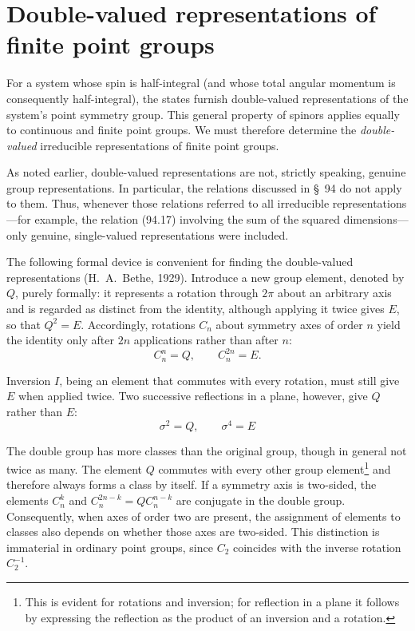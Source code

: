 \section{Double-valued representations of finite point groups}

For a system whose spin is half-integral (and whose total angular momentum is consequently half-integral), the states furnish double-valued representations of the system's point symmetry group. This general property of spinors applies equally to continuous and finite point groups. We must therefore determine the \emph{double-valued} irreducible representations of finite point groups.

As noted earlier, double-valued representations are not, strictly speaking, genuine group representations. In particular, the relations discussed in \S~94 do not apply to them. Thus, whenever those relations referred to all irreducible representations---for example, the relation (94.17) involving the sum of the squared dimensions---only genuine, single-valued representations were included.

The following formal device is convenient for finding the double-valued representations (H.~A.~Bethe, 1929). Introduce a new group element, denoted by $Q$, purely formally: it represents a rotation through $2\pi$ about an arbitrary axis and is regarded as distinct from the identity, although applying it twice gives $E$, so that $Q^2=E$. Accordingly, rotations $C_n$ about symmetry axes of order $n$ yield the identity only after $2n$ applications rather than after $n$:
\begin{equation}
 C_n^n=Q,\qquad C_n^{2n}=E. \tag{99.1}
\end{equation}

Inversion $I$, being an element that commutes with every rotation, must still give $E$ when applied twice. Two successive reflections in a plane, however, give $Q$ rather than $E$:
\begin{equation}
 \sigma^2=Q,\qquad \sigma^4=E \tag{99.2}
\end{equation}




The double group has more classes than the original group, though in general not twice as many. The element $Q$ commutes with every other group element\footnote{This is evident for rotations and inversion; for reflection in a plane it follows by expressing the reflection as the product of an inversion and a rotation.} and therefore always forms a class by itself. If a symmetry axis is two-sided, the elements $C_n^k$ and $C_n^{2n-k}=QC_n^{n-k}$ are conjugate in the double group. Consequently, when axes of order two are present, the assignment of elements to classes also depends on whether those axes are two-sided. This distinction is immaterial in ordinary point groups, since $C_2$ coincides with the inverse rotation $C_2^{-1}$.

